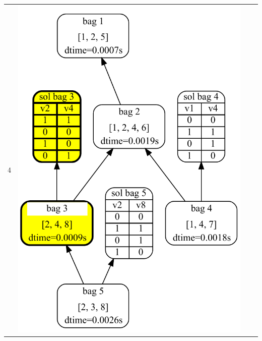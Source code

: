 \documentclass[a4paper, 12pt, bibliography=totoc]{scrartcl}
\begin{document}
\begin{table}
\begin{tabular}{l*3{c}}
	4 & \includegraphics[height=0.46\textheight]{images/DA4SAT/results/TDStep4.pdf} &

\end{tabular}
\end{table}
\end{document}
